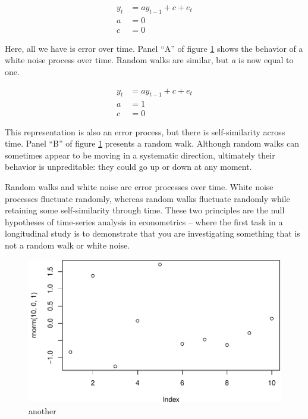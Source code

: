 \documentclass[english,,man]{apa6}
\theoremstyle{definition}
\theoremstyle{definition}
\theoremstyle{definition}
\theoremstyle{remark}
\begin{document}
\begin{equation}
\begin{split}
\label{whitenoise}
y_{t} &= a y_{t-1} + c + e_{t} \\
a &= 0 \\
c &= 0
\end{split}
\end{equation}

\noindent Here, all we have is error over time. Panel \enquote{A} of
figure \ref{noise} shows the behavior of a white noise process over
time. Random walks are similar, but \emph{a} is now equal to one.

\begin{equation}
\begin{split}
\label{rw}
y_{t} &= a y_{t-1} + c + e_{t} \\ 
a &= 1 \\ 
c &= 0
\end{split}
\end{equation}

\noindent This representation is also an error process, but there is
self-similarity across time. Panel \enquote{B} of figure \ref{noise}
presents a random walk. Although random walks can sometimes appear to be
moving in a systematic direction, ultimately their behavior is
unpreditable: they could go up or down at any moment.

Random walks and white noise are error processes over time. White noise
processes fluctuate randomly, whereas random walks fluctuate randomly
while retaining some self-similarity through time. These two principles
are the null hypotheses of time-series analysis in econometrics -- where
the first task in a longitudinal study is to demonstrate that you are
investigating something that is not a random walk or white noise.

\begin{figure}
\centering
\includegraphics{figs/unnamed-chunk-7-1.pdf}
\caption{\label{fig:unnamed-chunk-7}another\label{noise}}
\end{figure}
\end{document}
